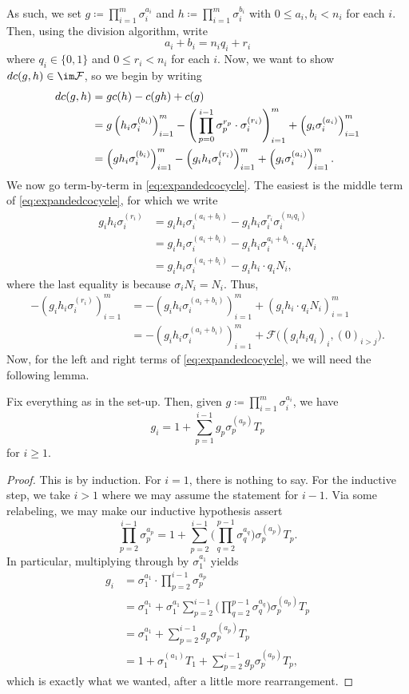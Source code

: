\documentclass{article}
\numberwithin{equation}{section}
\begin{document}
As such, we set $g\coloneqq\prod_{i=1}^m\sigma_i^{a_i}$ and $h\coloneqq\prod_{i=1}^m\sigma_i^{b_i}$ with $0\le a_i,b_i<n_i$ for each $i$. Then, using the division algorithm, write
\[a_i+b_i=n_iq_i+r_i\]
where $q_i\in\{0,1\}$ and $0\le r_i<n_i$ for each $i$. Now, we want to show $dc(g,h)\in\im\mathcal F$, so we begin by writing
\begin{align}
	dc(g,h) &= gc(h)-c(gh)+c(g) \notag \\
	&= g\left(h_i\sigma_i^{(b_i)}\right)_{i=1}^m-\Bigg(\prod_{p=0}^{i-1}\sigma_p^{r_p}\cdot\sigma_i^{(r_i)}\Bigg)_{i=1}^m+\left(g_i\sigma_i^{(a_i)}\right)_{i=1}^m \notag \\
	&= \left(gh_i\sigma_i^{(b_i)}\right)_{i=1}^m-\left(g_ih_i\sigma_i^{(r_i)}\right)_{i=1}^m+\left(g_i\sigma_i^{(a_i)}\right)_{i=1}^m. \label{eq:expandedcocycle}
\end{align}
We now go term-by-term in \autoref{eq:expandedcocycle}. The easiest is the middle term of \autoref{eq:expandedcocycle}, for which we write
\begin{align*}
	g_ih_i\sigma_i^{(r_i)} &= g_ih_i\sigma_i^{(a_i+b_i)}-g_ih_i\sigma_i^{r_i}\sigma_i^{(n_iq_i)} \\
	&= g_ih_i\sigma_i^{(a_i+b_i)}-g_ih_i\sigma_i^{a_i+b_i}\cdot q_iN_i \\
	&= g_ih_i\sigma_i^{(a_i+b_i)}-g_ih_i\cdot q_iN_i,
\end{align*}
where the last equality is because $\sigma_iN_i=N_i$. Thus,
\begin{align*}
	-\left(g_ih_i\sigma_i^{(r_i)}\right)_{i=1}^m &= -\left(g_ih_i\sigma_i^{(a_i+b_i)}\right)_{i=1}^m+\left(g_ih_i\cdot q_iN_i\right)_{i=1}^m \\
	&= -\left(g_ih_i\sigma_i^{(a_i+b_i)}\right)_{i=1}^m+\mathcal F\big((g_ih_iq_i)_i,(0)_{i>j}\big).
\end{align*}
Now, for the left and right terms of \autoref{eq:expandedcocycle}, we will need the following lemma.
\begin{lemma}
	Fix everything as in the set-up. Then, given $g\coloneqq\prod_{i=1}^m\sigma_i^{a_i}$, we have
	\[g_i=1+\sum_{p=1}^{i-1}g_p\sigma_p^{(a_p)}T_p\]
	for $i\ge1$.
\end{lemma}
\begin{proof}
	This is by induction. For $i=1$, there is nothing to say. For the inductive step, we take $i>1$ where we may assume the statement for $i-1$. Via some relabeling, we may make our inductive hypothesis assert
	\[\prod_{p=2}^{i-1}\sigma_p^{a_p}=1+\sum_{p=2}^{i-1}\Bigg(\prod_{q=2}^{p-1}\sigma_q^{a_q}\Bigg)\sigma_p^{(a_p)}T_p.\]
	In particular, multiplying through by $\sigma_1^{a_1}$ yields
	\begin{align*}
		g_i &= \sigma_1^{a_1}\cdot\prod_{p=2}^{i-1}\sigma_p^{a_p} \\
		&= \sigma_1^{a_1}+\sigma_1^{a_1}\sum_{p=2}^{i-1}\Bigg(\prod_{q=2}^{p-1}\sigma_q^{a_q}\Bigg)\sigma_p^{(a_p)}T_p \\
		&= \sigma_1^{a_1}+\sum_{p=2}^{i-1}g_p\sigma_p^{(a_p)}T_p \\
		&= 1+\sigma_1^{(a_1)}T_1+\sum_{p=2}^{i-1}g_p\sigma_p^{(a_p)}T_p,
	\end{align*}
	which is exactly what we wanted, after a little more rearrangement.
\end{proof}
\end{document}

